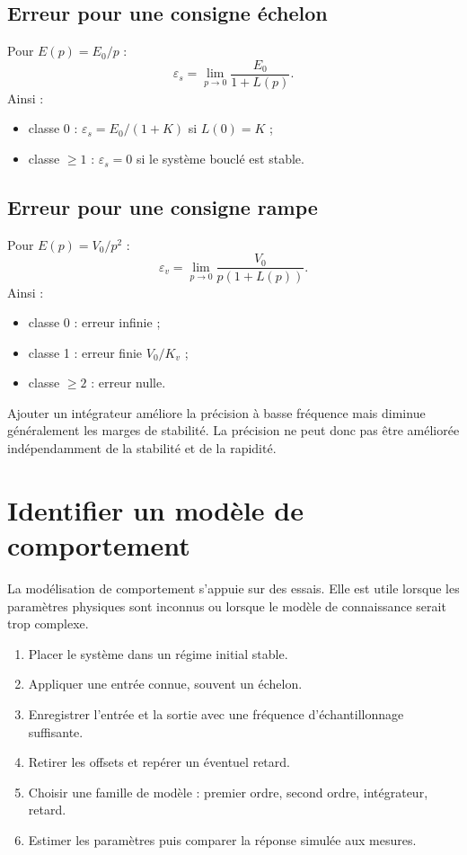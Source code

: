 \subsection{Erreur pour une consigne échelon}

Pour $E(p)=E_0/p$ :
\[
\varepsilon_s=\lim_{p\to0}\frac{E_0}{1+L(p)}.
\]
Ainsi :
\begin{itemize}
  \item classe 0 : $\varepsilon_s=E_0/(1+K)$ si $L(0)=K$ ;
  \item classe $\geq1$ : $\varepsilon_s=0$ si le système bouclé est stable.
\end{itemize}

\subsection{Erreur pour une consigne rampe}

Pour $E(p)=V_0/p^2$ :
\[
\varepsilon_v=\lim_{p\to0}\frac{V_0}{p(1+L(p))}.
\]
Ainsi :
\begin{itemize}
  \item classe 0 : erreur infinie ;
  \item classe 1 : erreur finie $V_0/K_v$ ;
  \item classe $\geq2$ : erreur nulle.
\end{itemize}

\begin{SAattention}
Ajouter un intégrateur améliore la précision à basse fréquence mais diminue généralement les marges de stabilité. La précision ne peut donc pas être améliorée indépendamment de la stabilité et de la rapidité.
\end{SAattention}

\section{Identifier un modèle de comportement}\label{sec:sa-identification}

La modélisation de comportement s'appuie sur des essais. Elle est utile lorsque les paramètres physiques sont inconnus ou lorsque le modèle de connaissance serait trop complexe.

\begin{SAmethode}[title={Démarche d'identification temporelle}]
\begin{enumerate}
  \item Placer le système dans un régime initial stable.
  \item Appliquer une entrée connue, souvent un échelon.
  \item Enregistrer l'entrée et la sortie avec une fréquence d'échantillonnage suffisante.
  \item Retirer les offsets et repérer un éventuel retard.
  \item Choisir une famille de modèle : premier ordre, second ordre, intégrateur, retard.
  \item Estimer les paramètres puis comparer la réponse simulée aux mesures.
\end{enumerate}
\end{SAmethode}


